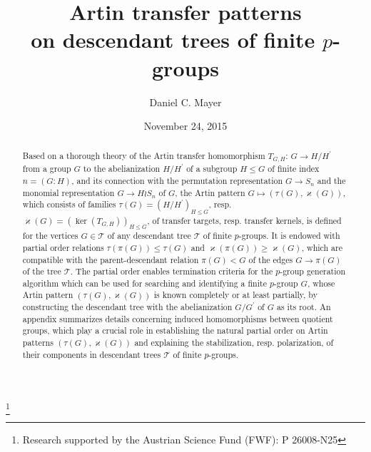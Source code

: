 \documentclass{amsart}
\theoremstyle{definition}
\numberwithin{equation}{section}
\begin{document}
\title[Artin transfer patterns on descendant trees]{Artin transfer patterns \\ on descendant trees of finite \(p\)-groups}

\author{Daniel C. Mayer}
\address{Naglergasse 53\\8010 Graz\\Austria}

\thanks{Research supported by the Austrian Science Fund (FWF): P 26008-N25}


\date{November 24, 2015}


\begin{abstract}
Based on a thorough theory of the Artin transfer homomorphism \(T_{G,H}:\,G\to H/H^\prime\)
from a group \(G\) to the abelianization \(H/H^\prime\) of a subgroup \(H\le G\) of finite index \(n=(G:H)\),
and its connection with the permutation representation \(G\to S_n\)
and the monomial representation \(G\to H\wr S_n\) of \(G\),
the Artin pattern \(G\mapsto(\tau(G),\varkappa(G))\), which consists of families
\(\tau(G)=(H/H^\prime)_{H\le G}\), resp. \(\varkappa(G)=(\ker(T_{G,H}))_{H\le G}\),
of transfer targets, resp. transfer kernels,
is defined for the vertices \(G\in\mathcal{T}\)
of any descendant tree \(\mathcal{T}\) of finite \(p\)-groups.
It is endowed with partial order relations
\(\tau(\pi(G))\le\tau(G)\) and \(\varkappa(\pi(G))\ge\varkappa(G)\),
which are compatible with the parent-descendant relation \(\pi(G)<G\)
of the edges \(G\to\pi(G)\) of the tree \(\mathcal{T}\).
The partial order enables termination criteria for the \(p\)-group generation algorithm
which can be used for searching and identifying a finite \(p\)-group \(G\),
whose Artin pattern \((\tau(G),\varkappa(G))\) is known completely or at least partially,
by constructing the descendant tree with the abelianization \(G/G^\prime\) of \(G\) as its root.
An appendix summarizes details concerning induced homomorphisms between quotient groups,
which play a crucial role
in establishing the natural partial order on Artin patterns \((\tau(G),\varkappa(G))\)
and explaining the stabilization, resp. polarization, of their components
in descendant trees \(\mathcal{T}\) of finite \(p\)-groups.
\end{abstract}
\end{document}
